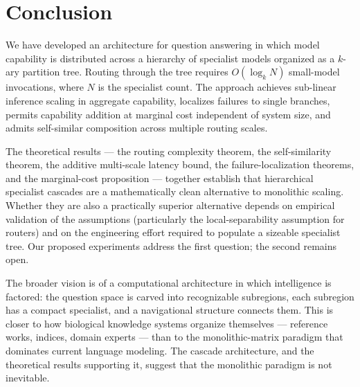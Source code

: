 \documentclass[11pt,a4paper]{article}
\theoremstyle{definition}
\theoremstyle{remark}
\begin{document}
\section{Conclusion}
\label{sec:conclusion}

We have developed an architecture for question answering in which model capability is distributed across a hierarchy of specialist models organized as a $k$-ary partition tree. Routing through the tree requires $O(\log_k N)$ small-model invocations, where $N$ is the specialist count. The approach achieves sub-linear inference scaling in aggregate capability, localizes failures to single branches, permits capability addition at marginal cost independent of system size, and admits self-similar composition across multiple routing scales.

The theoretical results --- the routing complexity theorem, the self-similarity theorem, the additive multi-scale latency bound, the failure-localization theorems, and the marginal-cost proposition --- together establish that hierarchical specialist cascades are a mathematically clean alternative to monolithic scaling. Whether they are also a practically superior alternative depends on empirical validation of the assumptions (particularly the local-separability assumption for routers) and on the engineering effort required to populate a sizeable specialist tree. Our proposed experiments address the first question; the second remains open.

The broader vision is of a computational architecture in which intelligence is factored: the question space is carved into recognizable subregions, each subregion has a compact specialist, and a navigational structure connects them. This is closer to how biological knowledge systems organize themselves --- reference works, indices, domain experts --- than to the monolithic-matrix paradigm that dominates current language modeling. The cascade architecture, and the theoretical results supporting it, suggest that the monolithic paradigm is not inevitable.



\end{document}
